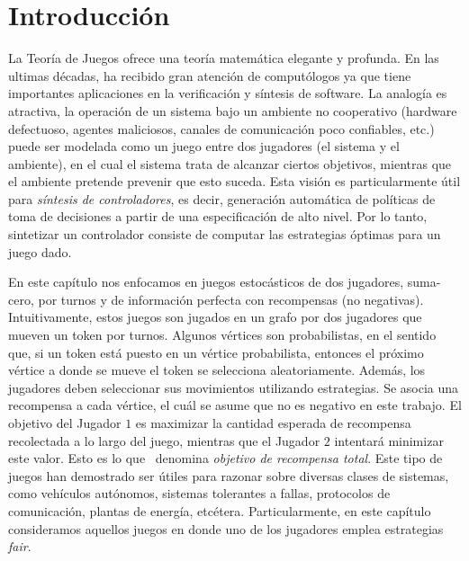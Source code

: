 \section{Introducción} \label{sec:intro_fair}
La Teoría de Juegos \cite{MorgensternNeuman42}  ofrece una teoría matemática elegante y profunda. 
En las ultimas décadas, ha recibido gran atención de computólogos ya que tiene importantes aplicaciones en la verificación y síntesis de software. 
La analogía es atractiva, la operación de un sistema bajo un ambiente no cooperativo (hardware defectuoso, agentes maliciosos, canales de comunicación poco confiables, etc.) puede ser modelada como un juego entre dos jugadores (el sistema y el ambiente), en el cual el sistema trata de alcanzar ciertos objetivos, mientras que el ambiente pretende prevenir que esto suceda. 
Esta visión es particularmente útil para \emph{síntesis de controladores}, es decir, generación automática de políticas de toma de decisiones a partir de una especificación de alto nivel. 
Por lo tanto, sintetizar un controlador consiste de computar las estrategias óptimas para un juego dado.
		
En este capítulo nos enfocamos en juegos estocásticos de dos jugadores, suma-cero, por turnos y de información perfecta con recompensas (no negativas)\cite{FilarV96}. 
Intuitivamente, estos juegos son jugados en un grafo por dos jugadores que mueven un token por turnos. Algunos vértices son probabilistas, en el sentido que, si un token está puesto en un vértice probabilista, entonces el próximo vértice a donde se mueve el token se selecciona aleatoriamente. Además, los jugadores deben seleccionar sus movimientos utilizando estrategias. Se asocia una recompensa a cada vértice, el cuál se asume que no es negativo en este trabajo. El objetivo del Jugador $1$ es maximizar la cantidad esperada de recompensa recolectada a lo largo del juego, mientras que el Jugador $2$ intentará minimizar este valor. Esto es lo que~\cite{SvorenovaKwiatkowska16} denomina \emph{objetivo de recompensa total}.
Este tipo de juegos han demostrado ser útiles para razonar sobre diversas clases de sistemas, como vehículos autónomos, sistemas tolerantes a fallas, protocolos de comunicación, plantas de energía, etcétera.  %
Particularmente, en este capítulo consideramos aquellos juegos en donde uno de los jugadores emplea estrategias \textit{fair}.


